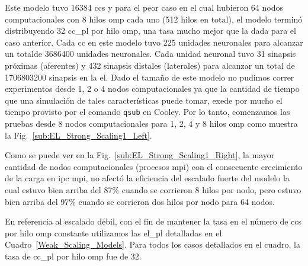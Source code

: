{Este modelo tuvo 16384 \glspl{cc} y para el peor caso en el cual hubieron 64 nodos computacionales con 8 hilos \gls{omp} cada uno (512 hilos en total), el modelo terminó distribuyendo 32 \gls{cc_pl} por hilo \gls{omp}, una tasa mucho mejor que la dada para el caso anterior.
Cada \gls{cc} en este modelo tuvo 225 unidades neuronales para alcanzar un totalde 3686400 unidades neuronales.
Cada unidad neuronal tuvo 31 sinapsis próximas (aferentes) y 432 sinapsis distales (laterales) para alcanzar un total de 1706803200 sinapsis en la \gls{el}.
Dado el tamaño de este modelo no pudimos correr experimentos desde 1, 2 o 4 nodos computacionales ya que la cantidad de tiempo que una simulación de tales características puede tomar, exede por mucho el tiempo provisto por el comando \texttt{qsub} en Cooley.
Por lo tanto, comenzamos las pruebas desde 8 nodos computacionales para  1, 2, 4 y 8 hilos \gls{omp} como muestra la Fig.~\ref{sub:EL_Strong_Scaling1_Left}.

Como se puede ver en la Fig.~\ref{sub:EL_Strong_Scaling1_Right}, la mayor cantidad de nodos computacionales (procesos \gls{mpi}) con el consecuente crecimiento de la carga en \gls{ipc} \gls{mpi}, no afectó la eficiencia del escalado fuerte del modelo la cual estuvo bien arriba del 87\% cuando se corrieron 8 hilos por nodo, pero estuvo bien arriba del 97\% cuando se corrieron dos hilos por nodo para 64 nodos. 

En referencia al escalado débil, con el fin de mantener la tasa en el número de \glspl{cc} por hilo \gls{omp} constante utilizamos las \gls{el_pl} detalladas en el Cuadro~\ref{Weak_Scaling_Models}.
Para todos los casos detallados en el cuadro, la tasa de \gls{cc_pl} por hilo \gls{omp} fue de 32.

}
